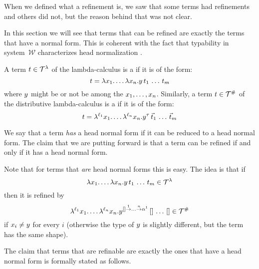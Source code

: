 When we defined what a refinement is, we saw that some terms had refinements and others
did not, but the reason behind that was not clear.

In this section we will see that terms that can be refined are exactly the terms
that have a normal form.
This is coherent with the fact that typability in system~$\mathcal{W}$ characterizes
head normalization \cite[Corollary 5.5]{bucciarelli2017non}.

\begin{definition}
A term $t \in \mathcal{T}^{\lambda}$ of the lambda-calculus is a 
if it is of the form:
\[
  t = \lambda x_1. \hdots\lambda x_n. y\,t_1\,\hdots\,t_m
\]
where $y$ might be or not be among the $x_1,\hdots,x_n$.
Similarly, a term $t \in \mathcal{T}^{\mathtt{\#}}$ of the distributive lambda-calculus is a 
if it is of the form:
\[
  t = \lambda^{\ell_1} x_1. \hdots\lambda^{\ell_n} x_n. y^{\tau}\,\vec{t}_1\,\hdots\,\vec{t}_m
\]
\end{definition}

We say that a term \emph{has} a head normal form if it can be reduced to a head normal form.
The claim that we are putting forward is that a term can be refined if and only if it has
a head normal form.

Note that for terms that \emph{are} head normal forms this is easy. The idea is that
if \[\lambda x_1. \hdots\lambda x_n. y\,t_1\,\hdots\,t_m \in \mathcal{T}^{\lambda}\]
then it is refined by
\[\lambda^{\ell_1} x_1. \hdots\lambda^{\ell_n} x_n. y^{[] \overset{1}{\to} \hdots \overset{n}{\to} \alpha^1}\,[]\,\hdots\,[] \in \mathcal{T}^{\mathtt{\#}}\]
if $x_i \neq y$ for every $i$ (otherwise the type of $y$ is slightly different,
but the term has the same shape).

The claim that terms that are refinable are exactly the ones that have
a head normal form is formally stated as follows.

